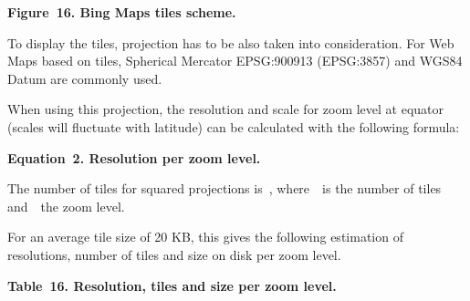 \documentclass[a4paper]{article}
\begin{document}
{\centering\bfseries
Figure\ 16. Bing Maps tiles scheme.
\par}


\bigskip

To display the tiles, projection has to be also taken into
consideration. For Web Maps based on tiles, Spherical Mercator
EPSG:900913 (EPSG:3857) and WGS84 Datum are commonly used.

When using this projection, the resolution and scale for zoom level at
equator (scales will fluctuate with latitude) can be calculated with
the following formula:

{\centering\bfseries
Equation\ 2. Resolution per zoom level.
\par}

{\centering \par}


\bigskip

The number of tiles for squared projections is\ , where\ \ is the number
of tiles and\ \ the zoom level.

For an average tile size of 20 KB, this gives the following estimation
of resolutions, number of tiles and size on disk per zoom level.\ 

{\centering\bfseries
Table\ 16. Resolution, tiles and size per zoom level.
\par}
\end{document}

